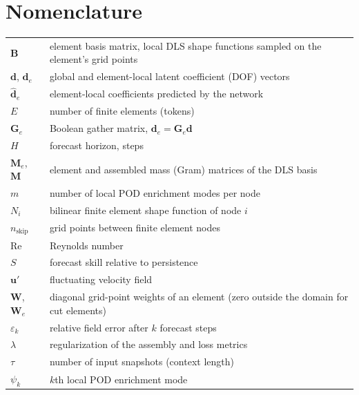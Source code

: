 \documentclass[conf]{new-aiaa}
\newcommand{\Rey}{\mathrm{Re}}
\newcommand{\dvec}{\mathbf{d}}
\newcommand{\dhat}{\hat{\mathbf{d}}}
\begin{document}
\section*{Nomenclature}

{\renewcommand\arraystretch{1.0}
\noindent\begin{longtable*}{@{}l @{\quad=\quad} l@{}}
$\mathbf{B}$ & element basis matrix, local DLS shape functions sampled on the element's grid points \\
$\dvec$, $\dvec_e$ & global and element-local latent coefficient (DOF) vectors \\
$\dhat_e$ & element-local coefficients predicted by the network \\
$E$ & number of finite elements (tokens) \\
$\mathbf{G}_e$ & Boolean gather matrix, $\dvec_e = \mathbf{G}_e\dvec$ \\
$H$ & forecast horizon, steps \\
$\mathbf{M}_e$, $\mathbf{M}$ & element and assembled mass (Gram) matrices of the DLS basis \\
$m$ & number of local POD enrichment modes per node \\
$N_i$ & bilinear finite element shape function of node $i$ \\
$n_\mathrm{skip}$ & grid points between finite element nodes \\
$\Rey$ & Reynolds number \\
$S$ & forecast skill relative to persistence \\
$\mathbf{u}'$ & fluctuating velocity field \\
$\mathbf{W}$, $\mathbf{W}_e$ & diagonal grid-point weights of an element (zero outside the domain for cut elements) \\
$\varepsilon_k$ & relative field error after $k$ forecast steps \\
$\lambda$ & regularization of the assembly and loss metrics \\
$\tau$ & number of input snapshots (context length) \\
$\psi_k$ & $k$th local POD enrichment mode
\end{longtable*}}

\end{document}
